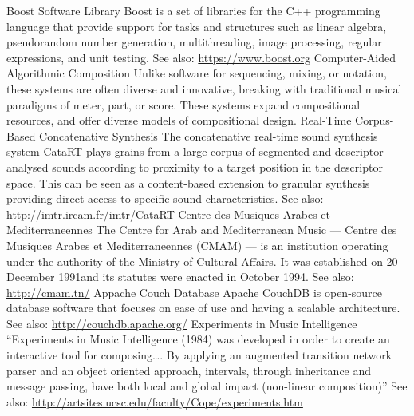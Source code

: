 	{Boost Software Library}
	{Boost is a set of libraries for the C++ programming language that provide support for tasks and structures such as linear algebra, pseudorandom number generation, multithreading, image processing, regular expressions, and unit testing. See also: \url{https://www.boost.org}}
	{Computer-Aided Algorithmic Composition}
	{Unlike software for sequencing, mixing, or notation, these systems are often diverse and innovative, breaking with traditional musical paradigms of meter, part, or score. These systems expand compositional resources, and offer diverse models of compositional design.}
	{Real-Time Corpus-Based Concatenative Synthesis}
	{The concatenative real-time sound synthesis system CataRT plays grains from a large corpus of segmented and descriptor-analysed sounds according to proximity to a target position in the descriptor space. This can be seen as a content-based extension to granular synthesis providing direct access to specific sound characteristics. See also: \url{http://imtr.ircam.fr/imtr/CataRT}}
	{Centre des Musiques Arabes et Mediterraneennes}
	{The Centre for Arab and Mediterranean Music --- Centre des Musiques Arabes et Mediterraneennes (CMAM) --- is an institution operating under the authority of the Ministry of Cultural Affairs. It was established on 20 December 1991and its statutes were enacted in October 1994. See also: \url{http://cmam.tn/}}
	{Appache Couch Database}
	{Apache CouchDB is open-source database software that focuses on ease of use and having a scalable architecture. See also: \url{http://couchdb.apache.org/}}
	{Experiments in Music Intelligence}
	{``Experiments in Music Intelligence (1984) was developed in order to create an interactive tool for composing\dots. By applying an augmented transition network parser and an object oriented approach, intervals, through inheritance and message passing, have both local and global impact (non-linear composition)'' See also: \url{http://artsites.ucsc.edu/faculty/Cope/experiments.htm}}
